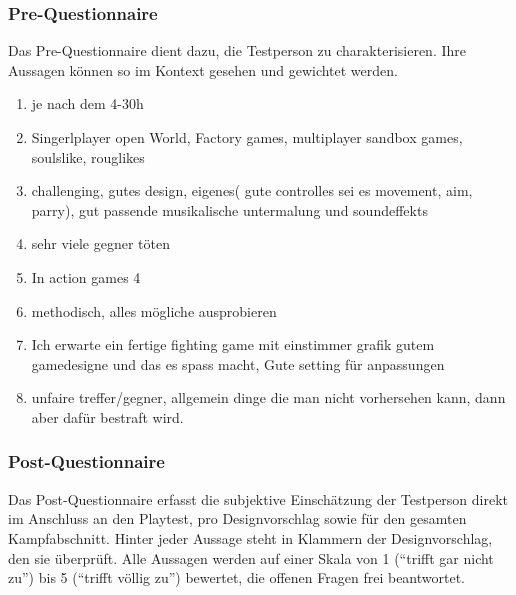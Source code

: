 \documentclass[../Main.tex]{subfiles}
\begin{document}
\subsubsection{Pre-Questionnaire}
 
Das Pre-Questionnaire dient dazu, die Testperson zu charakterisieren. Ihre Aussagen können so im Kontext gesehen und gewichtet werden.
 
\begin{enumerate}[label=\textbf{P\arabic*}, leftmargin=1.5cm, itemsep=0.5em]
    \item je nach dem 4-30h 
    \item Singerlplayer open World, Factory games, multiplayer sandbox games, soulslike, rouglikes
    \item challenging, gutes design, eigenes( gute controlles sei es movement, aim, parry), gut passende musikalische untermalung und soundeffekts
    \item sehr viele gegner töten
    \item In action games 4
    \item methodisch, alles mögliche ausprobieren
    \item Ich erwarte ein fertige fighting game mit einstimmer grafik gutem gamedesigne und das es spass macht, Gute setting für anpassungen
    \item unfaire treffer/gegner, allgemein dinge die man nicht vorhersehen kann, dann aber dafür bestraft wird.
\end{enumerate}

\subsubsection{Post-Questionnaire}
 
Das Post-Questionnaire erfasst die subjektive Einschätzung der Testperson direkt im Anschluss an den Playtest, pro Designvorschlag sowie für den gesamten Kampfabschnitt. Hinter jeder Aussage steht in Klammern der Designvorschlag, den sie überprüft. Alle Aussagen werden auf einer Skala von 1 (\enquote{trifft gar nicht zu}) bis 5 (\enquote{trifft völlig zu}) bewertet, die offenen Fragen frei beantwortet.
 
\end{document}
